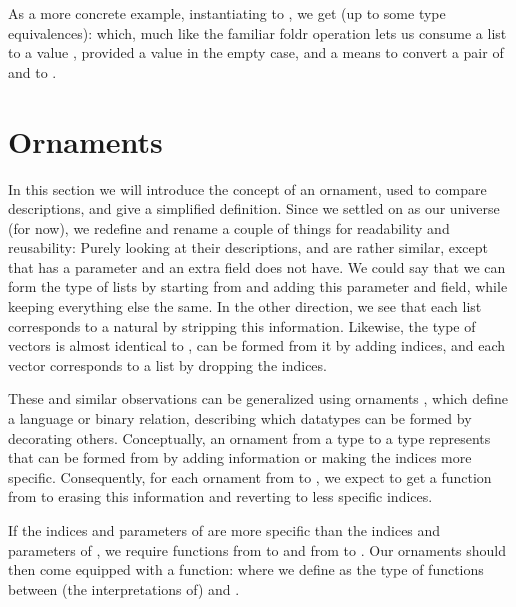 As a more concrete example, instantiating  to , we get (up to some type equivalences):
which, much like the familiar foldr operation lets us consume a list to a value , provided a value  in the empty case, and a means to convert a pair of  and  to .


\section{Ornaments}\label{sec:background-ornaments}
In this section we will introduce the concept of an ornament, used to compare descriptions, and give a simplified definition. Since we settled on  as our universe (for now), we redefine and rename a couple of things for readability and reusability:
Purely looking at their descriptions, \bN{} and  are rather similar, except that  has a parameter and an extra field \bN{} does not have. We could say that we can form the type of lists by starting from \bN{} and adding this parameter and field, while keeping everything else the same. In the other direction, we see that each list corresponds to a natural by stripping this information. Likewise, the type of vectors is almost identical to , can be formed from it by adding indices, and each vector corresponds to a list by dropping the indices.

These and similar observations can be generalized using ornaments \cite{algorn, progorn, sijsling}, which define a language or binary relation, describing which datatypes can be formed by decorating others. Conceptually, an ornament from a type  to a type  represents that  can be formed from  by adding information or making the indices more specific. Consequently, for each ornament from  to , we expect to get a function from  to  erasing this information and reverting to less specific indices.

If the indices  and parameters  of  are more specific than the indices  and parameters  of , we require functions from  to  and from  to . %
Our ornaments
should then come equipped with a function:
where we define  as the type of functions between (the interpretations of)  and .

